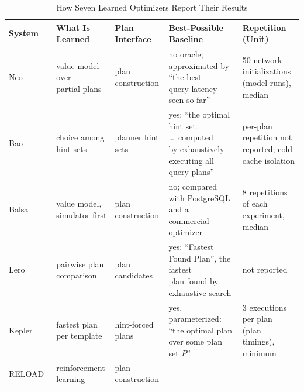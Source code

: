 \documentclass[conference]{IEEEtran}
\begin{document}
\begin{table}[t]
\caption{How Seven Learned Optimizers Report Their Results}
\label{tab:compare}
\centering
\footnotesize
\setlength{\tabcolsep}{3pt}
\begin{tabular}{|l|l|l|l|l|}
\hline
\textbf{System} & \textbf{What Is Learned} & \textbf{Plan Interface} &
  \textbf{Best-Possible Baseline} & \textbf{Repetition (Unit)} \\
\hline
Neo~\cite{neo} & \makecell[l]{value model over\\partial plans} &
  plan construction &
  \makecell[l]{no oracle; approximated by ``the best\\
               query latency seen so far''} &
  \makecell[l]{50 network initializations\\(model runs), median} \\
\hline
Bao~\cite{bao} & \makecell[l]{choice among\\hint sets} & planner hint sets &
  \makecell[l]{yes: ``the optimal hint set \dots\ computed\\
               by exhaustively executing all query plans''} &
  \makecell[l]{per-plan repetition not\\reported; cold-cache isolation} \\
\hline
Balsa~\cite{balsa} & \makecell[l]{value model,\\simulator first} &
  plan construction &
  \makecell[l]{no; compared with PostgreSQL and a\\
               commercial optimizer} &
  \makecell[l]{8 repetitions of each\\experiment, median} \\
\hline
Lero~\cite{lero} & \makecell[l]{pairwise plan\\comparison} & plan candidates &
  \makecell[l]{yes: ``Fastest Found Plan'', the fastest\\
               plan found by exhaustive search} &
  not reported \\
\hline
Kepler~\cite{kepler} & \makecell[l]{fastest plan\\per template} &
  hint-forced plans &
  \makecell[l]{yes, parameterized: ``the optimal plan\\
               over some plan set $P$''} &
  \makecell[l]{3 executions per plan\\(plan timings), minimum} \\
\hline
RELOAD~\cite{reload} & \makecell[l]{reinforcement\\learning} &
  plan construction &

\end{tabular}
\end{table}
\end{document}
